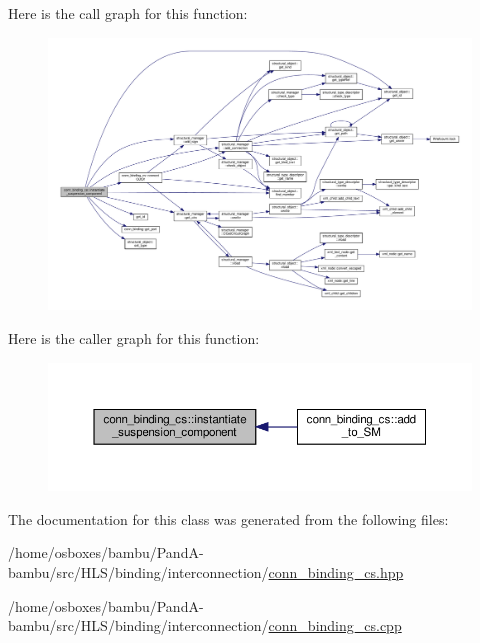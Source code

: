 Here is the call graph for this function\+:
\nopagebreak
\begin{figure}[H]
\begin{center}
\leavevmode
\includegraphics[width=350pt]{db/df4/classconn__binding__cs_a3738b716c0672637acb76998cfabbf71_cgraph}
\end{center}
\end{figure}
Here is the caller graph for this function\+:
\nopagebreak
\begin{figure}[H]
\begin{center}
\leavevmode
\includegraphics[width=350pt]{db/df4/classconn__binding__cs_a3738b716c0672637acb76998cfabbf71_icgraph}
\end{center}
\end{figure}


The documentation for this class was generated from the following files\+:\begin{DoxyCompactItemize}
\item 
/home/osboxes/bambu/\+Pand\+A-\/bambu/src/\+H\+L\+S/binding/interconnection/\hyperlink{conn__binding__cs_8hpp}{conn\+\_\+binding\+\_\+cs.\+hpp}\item 
/home/osboxes/bambu/\+Pand\+A-\/bambu/src/\+H\+L\+S/binding/interconnection/\hyperlink{conn__binding__cs_8cpp}{conn\+\_\+binding\+\_\+cs.\+cpp}\end{DoxyCompactItemize}
